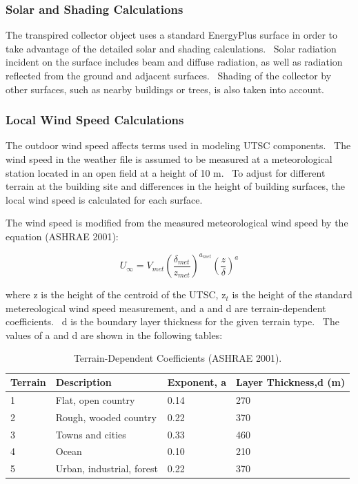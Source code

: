 \subsubsection{Solar and Shading Calculations}\label{solar-and-shading-calculations-2}

The transpired collector object uses a standard EnergyPlus surface in order to take advantage of the detailed solar and shading calculations.~ Solar radiation incident on the surface includes beam and diffuse radiation, as well as radiation reflected from the ground and adjacent surfaces.~ Shading of the collector by other surfaces, such as nearby buildings or trees, is also taken into account.

\subsubsection{Local Wind Speed Calculations}\label{local-wind-speed-calculations-000}

The outdoor wind speed affects terms used in modeling UTSC components.~ The wind speed in the weather file is assumed to be measured at a meteorological station located in an open field at a height of 10 m.~ To adjust for different terrain at the building site and differences in the height of building surfaces, the local wind speed is calculated for each surface.

The wind speed is modified from the measured meteorological wind speed by the equation (ASHRAE 2001):

\begin{equation}
{U_\infty } = {V_{met}}{\left( {\frac{{{\delta_{met}}}}{{{z_{met}}}}} \right)^{{a_{met}}}}{\left( {\frac{z}{\delta }} \right)^a}
\end{equation}

where z is the height of the centroid of the UTSC, z\(_{t}\) is the height of the standard metereological wind speed measurement, and a and d are terrain-dependent coefficients.~ d is the boundary layer thickness for the given terrain type.~ The values of a and d are shown in the following tables:

\begin{longtable}[c]{@{}llll@{}}
\caption{Terrain-Dependent Coefficients (ASHRAE 2001). \protect \label{table:terrain-dependent-coefficients-ashrae-2001.-001}}\\
\toprule 
Terrain & Description & Exponent, a & Layer Thickness,d (m) \tabularnewline \midrule
\endhead
1 & Flat, open country & 0.14 & 270 \tabularnewline
2 & Rough, wooded country & 0.22 & 370 \tabularnewline
3 & Towns and cities & 0.33 & 460 \tabularnewline
4 & Ocean & 0.10 & 210 \tabularnewline
5 & Urban, industrial, forest & 0.22 & 370 \tabularnewline
\bottomrule
\end{longtable}


